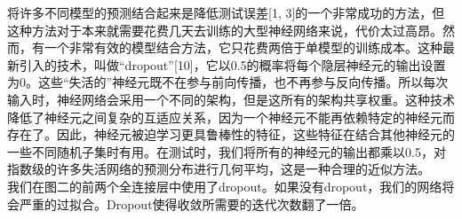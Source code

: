 将许多不同模型的预测结合起来是降低测试误差[1, 3]的一个非常成功的方法，但这种方法对于本来就需要花费几天去训练的大型神经网络来说，代价太过高昂。然而，有一个非常有效的模型结合方法，它只花费两倍于单模型的训练成本。这种最新引入的技术，叫做“dropout”[10]，它以0.5的概率将每个隐层神经元的输出设置为0。这些“失活的”神经元既不在参与前向传播，也不再参与反向传播。所以每次输入时，神经网络会采用一个不同的架构，但是这所有的架构共享权重。这种技术降低了神经元之间复杂的互适应关系，因为一个神经元不能再依赖特定的神经元而存在了。因此，神经元被迫学习更具鲁棒性的特征，这些特征在结合其他神经元的一些不同随机子集时有用。在测试时，我们将所有的神经元的输出都乘以0.5，对指数级的许多失活网络的预测分布进行几何平均，这是一种合理的近似方法。\\

我们在图二的前两个全连接层中使用了dropout。如果没有dropout，我们的网络将会严重的过拟合。Dropout使得收敛所需要的迭代次数翻了一倍。